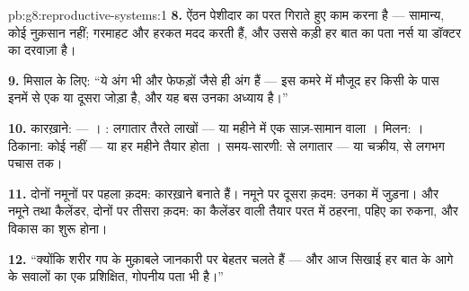\begin{solution}{pb:g8:reproductive-systems:1}
\textbf{8.} ऐंठन पेशीदार  का परत गिराते हुए काम करना है ---
सामान्य, कोई नुक़सान नहीं; गरमाहट और हरकत मदद करती हैं, और उससे कड़ी हर
बात का पता नर्स या डॉक्टर का दरवाज़ा है।

\textbf{9.} मिसाल के लिए: ``ये अंग भी  और फेफड़ों जैसे ही अंग हैं ---
इस कमरे में मौजूद हर किसी के पास इनमें से एक या दूसरा जोड़ा है, और यह
बस उनका अध्याय है।''

\textbf{10.} कारख़ाने:  --- । : लगातार तैरते लाखों ---
या महीने में एक साज़-सामान वाला । मिलन: । ठिकाना: कोई नहीं
--- या हर महीने तैयार होता । समय-सारणी:  से लगातार ---
या चक्रीय,  से लगभग पचास तक।

\textbf{11.} दोनों नमूनों पर पहला क़दम: कारख़ाने  बनाते हैं। 
नमूने पर दूसरा क़दम: उनका  में जुड़ना। और नमूने तथा कैलेंडर,
दोनों पर तीसरा क़दम:  का कैलेंडर वाली तैयार परत में ठहरना, पहिए
का रुकना, और विकास का शुरू होना।

\textbf{12.} ``क्योंकि शरीर गप के मुक़ाबले जानकारी पर बेहतर चलते हैं ---
और आज सिखाई हर बात के आगे के सवालों का एक प्रशिक्षित, गोपनीय पता भी
है।''
\end{solution}
